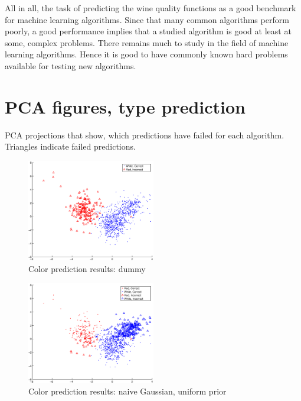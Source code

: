 \documentclass[twoside]{article}
\begin{document}
\begin{multicols}{2}
All in all, the task of predicting the wine quality functions as a good benchmark for machine learning algorithms. Since
that many common algorithms perform poorly, a good performance implies that a studied algorithm is good at least at some, complex problems.
There remains much to study in the field of machine learning algorithms. Hence it is good to have commonly known hard problems available for testing
new algorithms.



{}

\appendix

\section{PCA figures, type prediction}\label{appendix:colorpcakuvet}
PCA projections that show, which predictions have failed for each algorithm.
Triangles indicate failed predictions.

\begin{figure}[H]
\centering
\includegraphics[width=0.5\textwidth]{colorpca/dummy}
\caption{Color prediction results: dummy}
\end{figure}

\begin{figure}[H]
\centering
\includegraphics[width=0.5\textwidth]{colorpca/naive_noprior}
\caption{Color prediction results: naive Gaussian, uniform prior}
\end{figure}


\end{multicols}
\end{document}

